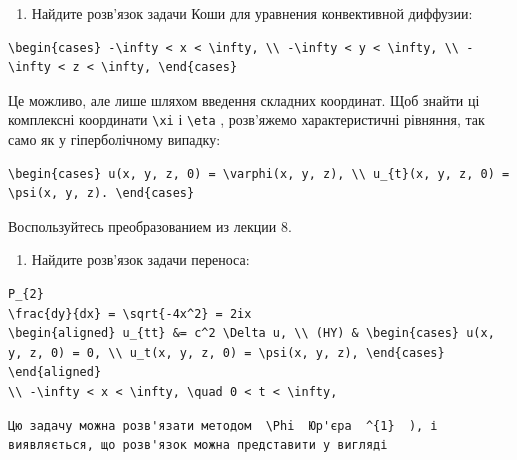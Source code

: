 \documentclass[
  ukrainian,
]{article}
\providecommand{\tightlist}{%
  \setlength{\itemsep}{0pt}\setlength{\parskip}{0pt}}
\begin{document}
\begin{enumerate}
\def\labelenumi{\arabic{enumi}.}
\setcounter{enumi}{1}
\tightlist
\item
  Найдите розв'язок задачи Коши для уравнения конвективной диффузии:
\end{enumerate}

\begin{verbatim}
\begin{cases} -\infty < x < \infty, \\ -\infty < y < \infty, \\ -\infty < z < \infty, \end{cases}
\end{verbatim}

Це можливо, але лише шляхом введення складних координат. Щоб знайти ці
комплексні координати \texttt{\textbackslash{}xi} і
\texttt{\textbackslash{}eta} , розв'яжемо характеристичні рівняння, так
само як у гіперболічному випадку:

\begin{verbatim}
\begin{cases} u(x, y, z, 0) = \varphi(x, y, z), \\ u_{t}(x, y, z, 0) = \psi(x, y, z). \end{cases}
\end{verbatim}

Воспользуйтесь преобразованием из лекции 8.

\begin{enumerate}
\def\labelenumi{\arabic{enumi}.}
\setcounter{enumi}{2}
\tightlist
\item
  Найдите розв'язок задачи переноса:
\end{enumerate}

\begin{verbatim}
P_{2}
\frac{dy}{dx} = \sqrt{-4x^2} = 2ix
\begin{aligned} u_{tt} &= c^2 \Delta u, \\ (HY) & \begin{cases} u(x, y, z, 0) = 0, \\ u_t(x, y, z, 0) = \psi(x, y, z), \end{cases} \end{aligned}
\\ -\infty < x < \infty, \quad 0 < t < \infty,
\end{verbatim}

\begin{verbatim}
Цю задачу можна розв'язати методом  \Phi  Юр'єра  ^{1}  ), і виявляється, що розв'язок можна представити у вигляді
\end{verbatim}
\end{document}
